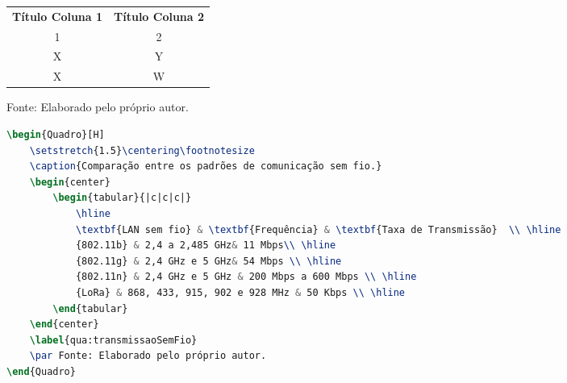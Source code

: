 \begin{Quadro}[H]
    \centering\footnotesize
    \caption{Quadro sem sentido.}
    \begin{center}
        \begin{tabular}{|c|c|}
            \hline
            \textbf{Título Coluna 1} & \textbf{Título Coluna 2}\\
            1 & 2 \\
            \hline
            X & Y \\
            \hline
            X & W \\
            \hline
        \end{tabular}
    \end{center}
    \label{qua:tabela-ssentido}
    \par Fonte: Elaborado pelo próprio autor.
\end{Quadro}

\begin{lstlisting}[language=TeX, caption={Comunicação Code}]
\begin{Quadro}[H]
    \setstretch{1.5}\centering\footnotesize
    \caption{Comparação entre os padrões de comunicação sem fio.}
    \begin{center}
        \begin{tabular}{|c|c|c|}
            \hline
            \textbf{LAN sem fio} & \textbf{Frequência} & \textbf{Taxa de Transmissão}  \\ \hline
            {802.11b} & 2,4 a 2,485 GHz& 11 Mbps\\ \hline
            {802.11g} & 2,4 GHz e 5 GHz& 54 Mbps \\ \hline
            {802.11n} & 2,4 GHz e 5 GHz & 200 Mbps a 600 Mbps \\ \hline
            {LoRa} & 868, 433, 915, 902 e 928 MHz & 50 Kbps \\ \hline
        \end{tabular}
    \end{center}
    \label{qua:transmissaoSemFio}
    \par Fonte: Elaborado pelo próprio autor.
\end{Quadro}
\end{lstlisting}

\hfill

